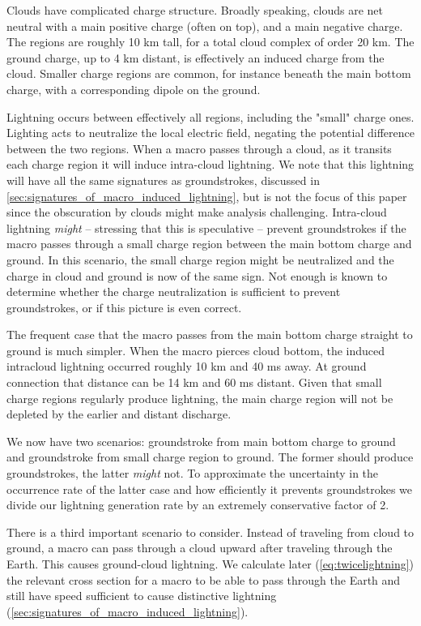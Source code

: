 \documentclass[%
 reprint,
 amsmath,amssymb,
 aps,
]{revtex4-2}
\newcommand{\vtwo}[1]{{\color{red} #1}}
\begin{document}
        \vtwo{
        Clouds have complicated charge structure. Broadly speaking, clouds are net neutral with a main positive charge (often on top), and a main negative charge. The regions are roughly 10 km tall, for a total cloud complex of order 20 km. The ground charge, up to 4 km distant, is effectively an induced charge from the cloud. Smaller charge regions are common, for instance beneath the main bottom charge, with a corresponding dipole on the ground.
        
        Lightning occurs between effectively all regions, including the "small" charge ones. Lighting acts to neutralize the local electric field, negating the potential difference between the two regions. When a macro passes through a cloud, as it transits each charge region it will induce intra-cloud lightning. We note that this lightning will have all the same signatures as groundstrokes, discussed in \ref{sec:signatures_of_macro_induced_lightning}, but is not the focus of this paper since the obscuration by clouds might make analysis challenging. Intra-cloud lightning \textit{might} -- stressing that this is speculative -- prevent groundstrokes if the macro passes through a small charge region between the main bottom charge and ground. In this scenario, the small charge region might be neutralized and the charge in cloud and ground is now of the same sign. Not enough is known to determine whether the charge neutralization is sufficient to prevent groundstrokes, or if this picture is even correct.
        
        The frequent case that the macro passes from the main bottom charge straight to ground is much simpler. When the macro pierces cloud bottom, the induced intracloud lightning occurred roughly 10 km and 40 ms away. At ground connection that distance can be 14 km and 60 ms distant. Given that small charge regions regularly produce lightning, the main charge region will not be depleted by the earlier and distant discharge.

        We now have two scenarios: groundstroke from main bottom charge to ground and groundstroke from small charge region to ground. The former should produce groundstrokes, the latter \textit{might} not. To approximate the uncertainty in the occurrence rate of the latter case and how efficiently it prevents groundstrokes we divide our lightning generation rate by an extremely conservative factor of 2.
        
        There is a third important scenario to consider. Instead of traveling from cloud to ground, a macro can pass through a cloud upward after traveling through the Earth. This causes ground-cloud lightning. We calculate later (\ref{eq:twicelightning}) the relevant cross section for a macro to be able to pass through the Earth and still have speed sufficient to cause distinctive lightning (\ref{sec:signatures_of_macro_induced_lightning}).
        }
\end{document}
